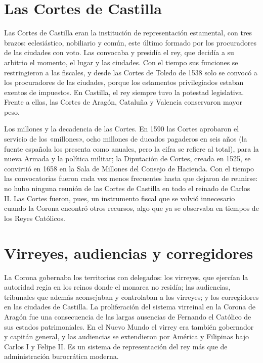 \documentclass{book}
\begin{document}

\section{Las Cortes de Castilla}

Las Cortes de Castilla eran la institución de representación estamental, con tres brazos: eclesiástico, nobiliario y común, este último formado por los procuradores de las ciudades con voto. Las convocaba y presidía el rey, que decidía a su arbitrio el momento, el lugar y las ciudades. Con el tiempo sus funciones se restringieron a las fiscales, y desde las Cortes de Toledo de 1538 solo se convocó a los procuradores de las ciudades, porque los estamentos privilegiados estaban exentos de impuestos. En Castilla, el rey siempre tuvo la potestad legislativa. Frente a ellas, las Cortes de Aragón, Cataluña y Valencia conservaron mayor peso.


Los millones y la decadencia de las Cortes. En 1590 las Cortes aprobaron el servicio de los «millones», ocho millones de ducados pagaderos en seis años (la fuente española los presenta como anuales, pero la cifra se refiere al total), para la nueva Armada y la política militar; la Diputación de Cortes, creada en 1525, se convirtió en 1658 en la Sala de Millones del Consejo de Hacienda. Con el tiempo las convocatorias fueron cada vez menos frecuentes hasta que dejaron de reunirse: no hubo ninguna reunión de las Cortes de Castilla en todo el reinado de Carlos II. Las Cortes fueron, pues, un instrumento fiscal que se volvió innecesario cuando la Corona encontró otros recursos, algo que ya se observaba en tiempos de los Reyes Católicos.


\section{Virreyes, audiencias y corregidores}

La Corona gobernaba los territorios con delegados: los virreyes, que ejercían la autoridad regia en los reinos donde el monarca no residía; las audiencias, tribunales que además aconsejaban y controlaban a los virreyes; y los corregidores en las ciudades de Castilla. La proliferación del sistema virreinal en la Corona de Aragón fue una consecuencia de las largas ausencias de Fernando el Católico de sus estados patrimoniales. En el Nuevo Mundo el virrey era también gobernador y capitán general, y las audiencias se extendieron por América y Filipinas bajo Carlos I y Felipe II. Es un sistema de representación del rey más que de administración burocrática moderna.
\end{document}
